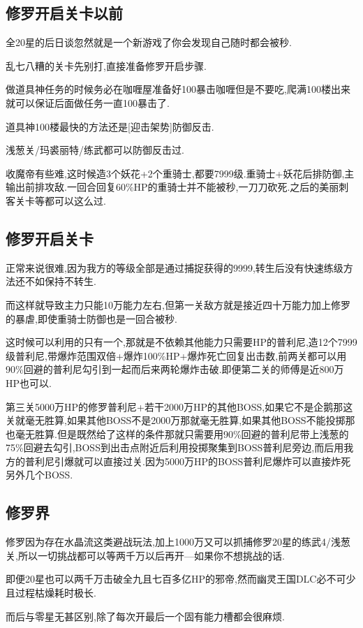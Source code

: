 	\newpage

	\subsection{修罗开启关卡以前}

	全20星的后日谈忽然就是一个新游戏了你会发现自己随时都会被秒.

	乱七八糟的关卡先别打,直接准备修罗开启步骤.

	做道具神任务的时候务必在咖喱屋准备好100暴击咖喱但是不要吃,爬满100楼出来就可以保证后面做任务一直100暴击了.

	道具神100楼最快的方法还是[迎击架势]防御反击.

	浅葱关/玛裘丽特/练武都可以防御反击过.

	收魔帝有些难,这时候造3个妖花+2个重骑士,都要7999级.重骑士+妖花后排防御,主输出前排攻敌.一回合回复60\%HP的重骑士并不能被秒,一刀刀砍死.之后的美丽刺客关卡等都可以这么过.

	\subsection{修罗开启关卡}

	正常来说很难,因为我方的等级全部是通过捕捉获得的9999,转生后没有快速练级方法还不如保持不转生.

	而这样就导致主力只能10万能力左右,但第一关敌方就是接近四十万能力加上修罗的暴虐,即使重骑士防御也是一回合被秒.

	这时候可以利用的只有一个,那就是不依赖其他能力只需要HP的普利尼,造12个7999级普利尼,带爆炸范围双倍+爆炸100\%HP+爆炸死亡回复出击数,前两关都可以用90\%回避的普利尼勾引到一起而后来两轮爆炸击破.即便第二关的师傅是近800万HP也可以.

	第三关5000万HP的修罗普利尼+若干2000万HP的其他BOSS,如果它不是企鹅那这关就毫无胜算,如果其他BOSS不是2000万那就毫无胜算,如果其他BOSS不能投掷那也毫无胜算.但是既然给了这样的条件那就只需要用90\%回避的普利尼带上浅葱的75\%回避去勾引,BOSS到出击点附近后利用投掷聚集到BOSS普利尼旁边,而后用我方的普利尼引爆就可以直接过关.因为5000万HP的BOSS普利尼爆炸可以直接炸死另外几个BOSS.

	\subsection{修罗界}

	修罗因为存在水晶流这类避战玩法,加上1000万又可以抓捕修罗20星的练武4/浅葱关,所以一切挑战都可以等两千万以后再开---如果你不想挑战的话.

	即便20星也可以两千万击破全九且七百多亿HP的邪帝,然而幽灵王国DLC必不可少且过程枯燥耗时极长.

	而后与零星无甚区别,除了每次开最后一个固有能力槽都会很麻烦.
	
